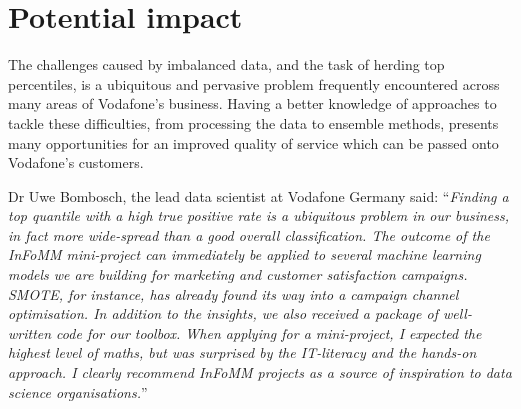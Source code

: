 \documentclass[english,a4paper,twoside,9pt]{extarticle}
\begin{document}
\section{Potential impact}

The challenges caused by imbalanced data, and the task of herding top percentiles, is a ubiquitous and pervasive problem frequently encountered across many areas of Vodafone's business. Having a better knowledge of approaches to tackle these difficulties, from processing the data to ensemble methods, presents many opportunities for an improved quality of service which can be passed onto Vodafone's customers. 

Dr Uwe Bombosch, the lead data scientist at Vodafone Germany said:
``\emph{Finding a top quantile with a high true positive rate is a ubiquitous problem in our business, in fact more wide-spread than a good overall classification. The outcome of the InFoMM mini-project can immediately be applied to several machine learning models we are building for marketing and customer satisfaction campaigns. SMOTE, for instance, has already found its way into a campaign channel optimisation. In addition to the insights, we also received a package of well-written code for our toolbox. When applying for a mini-project, I expected the highest level of maths, but was surprised by the IT-literacy and the hands-on approach. I clearly recommend InFoMM projects as a source of inspiration to data science organisations.}''


\clearpage
\end{document}
